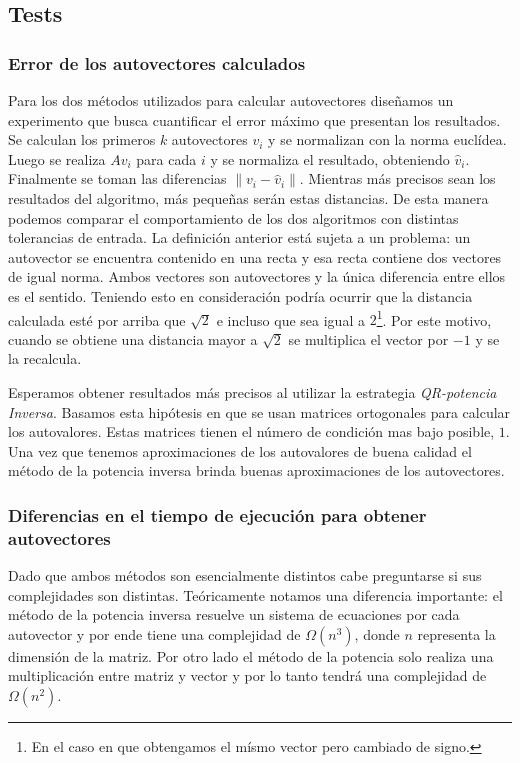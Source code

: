 \subsection{Tests}

	\subsubsection{Error de los autovectores calculados}
		Para los dos m\'etodos utilizados para calcular autovectores
		dise\~namos un experimento que busca cuantificar el error m\'aximo
		que presentan los resultados.
		Se calculan los primeros $k$ autovectores $v_i$ y se normalizan con la
		norma eucl\'idea. Luego se realiza $Av_i$ para cada $i$ y se normaliza
		el resultado, obteniendo $\hat{v}_i$. Finalmente se toman las diferencias
		$\|v_i-\hat{v}_i\|$. Mientras m\'as precisos sean los resultados del
		algoritmo, m\'as peque\~nas ser\'an estas distancias.
		De esta manera podemos comparar el comportamiento de los dos algoritmos
		con distintas tolerancias de entrada.
		La definici\'on anterior est\'a sujeta a un problema:
		un autovector se encuentra contenido en una recta y esa recta contiene
		dos vectores de igual norma. Ambos vectores son autovectores y la \'unica
		diferencia entre ellos es el sentido. Teniendo esto en consideraci\'on
		podr\'ia ocurrir que la distancia calculada est\'e por arriba que $\sqrt{2}$
		e incluso que sea igual a $2$\footnote{En el caso en que obtengamos el m\'ismo
		vector pero cambiado de signo.}. Por este motivo, cuando se obtiene una
		distancia mayor a $\sqrt{2}$ se multiplica el vector por $-1$ y se la
		recalcula.
		
		Esperamos obtener resultados m\'as precisos al utilizar la estrategia
		\textit{QR-potencia Inversa}. Basamos esta hip\'otesis en que se usan
		matrices ortogonales para calcular los autovalores. Estas matrices
		tienen el n\'umero de condici\'on mas bajo posible, $1$.
		Una vez que tenemos aproximaciones de los autovalores de buena calidad
		el m\'etodo de la potencia inversa brinda buenas aproximaciones de los
		autovectores.

	\subsubsection{Diferencias en el tiempo de ejecuci\'on para obtener autovectores}
		Dado que ambos m\'etodos son esencialmente distintos cabe preguntarse
		si sus complejidades son distintas. Te\'oricamente notamos una diferencia
		importante: el m\'etodo de la potencia inversa resuelve un sistema de
		ecuaciones por cada autovector y por ende tiene una complejidad de $\Omega(n^3)$,
		donde $n$ representa la dimensi\'on de la matriz. Por otro lado el m\'etodo
		de la potencia solo realiza una multiplicaci\'on entre matriz y vector
		y por lo tanto tendr\'a una complejidad de $\Omega(n^2)$.

